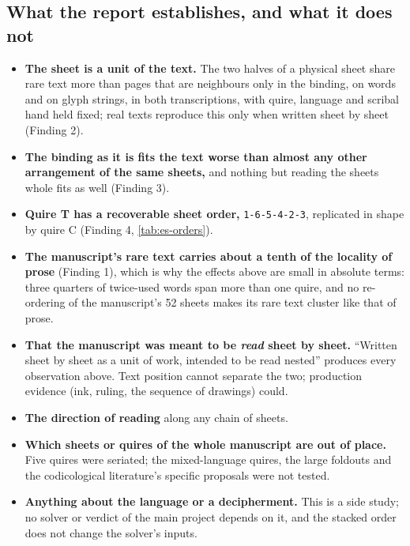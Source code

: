 \documentclass[11pt,a4paper]{article}
\newcommand{\order}[1]{\texttt{#1}}
\begin{document}
\subsection*{What the report establishes, and what it does not}

\begin{establishes}
\begin{itemize}
\item \textbf{The sheet is a unit of the text.} The two halves of a physical sheet share rare text more than pages that are neighbours only in the binding, on words and on glyph strings, in both transcriptions, with quire, language and scribal hand held fixed; real texts reproduce this only when written sheet by sheet (Finding 2).
\item \textbf{The binding as it is fits the text worse than almost any other arrangement of the same sheets,} and nothing but reading the sheets whole fits as well (Finding 3).
\item \textbf{Quire T has a recoverable sheet order,} \order{1-6-5-4-2-3}, replicated in shape by quire C (Finding 4, \cref{tab:es-orders}).
\item \textbf{The manuscript's rare text carries about a tenth of the locality of prose} (Finding 1), which is why the effects above are small in absolute terms: three quarters of twice-used words span more than one quire, and no re-ordering of the manuscript's 52 sheets makes its rare text cluster like that of prose.
\end{itemize}
\end{establishes}

\begin{notestablished}
\begin{itemize}
\item \textbf{That the manuscript was meant to be \emph{read} sheet by sheet.} ``Written sheet by sheet as a unit of work, intended to be read nested'' produces every observation above. Text position cannot separate the two; production evidence (ink, ruling, the sequence of drawings) could.
\item \textbf{The direction of reading} along any chain of sheets.
\item \textbf{Which sheets or quires of the whole manuscript are out of place.} Five quires were seriated; the mixed-language quires, the large foldouts and the codicological literature's specific proposals were not tested.
\item \textbf{Anything about the language or a decipherment.} This is a side study; no solver or verdict of the main project depends on it, and the stacked order does not change the solver's inputs.
\end{itemize}
\end{notestablished}
\end{document}
